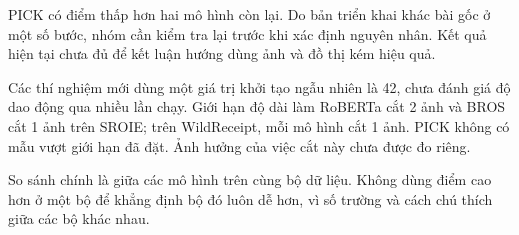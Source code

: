 PICK có điểm thấp hơn hai mô hình còn lại. Do bản triển khai khác bài gốc ở một số bước, nhóm cần kiểm tra lại trước khi xác định nguyên nhân. Kết quả hiện tại chưa đủ để kết luận hướng dùng ảnh và đồ thị kém hiệu quả.

Các thí nghiệm mới dùng một giá trị khởi tạo ngẫu nhiên là 42, chưa đánh giá độ dao động qua nhiều lần chạy. Giới hạn độ dài làm RoBERTa cắt 2 ảnh và BROS cắt 1 ảnh trên SROIE; trên WildReceipt, mỗi mô hình cắt 1 ảnh. PICK không có mẫu vượt giới hạn đã đặt. Ảnh hưởng của việc cắt này chưa được đo riêng.

So sánh chính là giữa các mô hình trên cùng bộ dữ liệu. Không dùng điểm cao hơn ở một bộ để khẳng định bộ đó luôn dễ hơn, vì số trường và cách chú thích giữa các bộ khác nhau.
